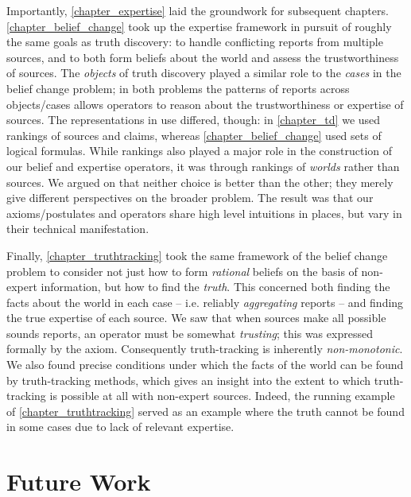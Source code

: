 Importantly, \cref{chapter_expertise} laid the groundwork for subsequent
chapters. \cref{chapter_belief_change} took up the expertise framework in
pursuit of roughly the same goals as truth discovery: to handle conflicting
reports from multiple sources, and to both form beliefs about the world and
assess the trustworthiness of sources. The \emph{objects} of truth discovery
played a similar role to the \emph{cases} in the belief change problem; in both
problems the patterns of reports across objects/cases allows operators to
reason about the trustworthiness or expertise of sources. The representations
in use differed, though: in \cref{chapter_td} we used rankings of sources and
claims, whereas \cref{chapter_belief_change} used sets of logical formulas.
While rankings also played a major role in the construction of our belief and
expertise operators, it was through rankings of \emph{worlds} rather than
sources. We argued on  that neither choice is
better than the other; they merely give different perspectives on the broader
problem. The result was that our axioms/postulates and operators share high
level intuitions in places, but vary in their technical manifestation.

{
    

Finally, \cref{chapter_truthtracking} took the same framework of the belief
change problem to consider not just how to form \emph{rational} beliefs on the
basis of non-expert information, but how to find the \emph{truth}. This
concerned both finding the facts about the world in each case -- i.e. reliably
\emph{aggregating} reports -- and finding the true expertise of each source.
We saw that when sources make all possible sounds reports, an operator must be
somewhat \emph{trusting}; this was expressed formally by the \credulity{}
axiom. Consequently truth-tracking is inherently \emph{non-monotonic}. We also
found precise conditions under which the facts of the world can be found by
truth-tracking methods, which gives an insight into the extent to which
truth-tracking is possible at all with non-expert sources. Indeed, the running
example of \cref{chapter_truthtracking} served as an example where the truth
cannot be found in some cases due to lack of relevant expertise.

}

\section{Future Work}
